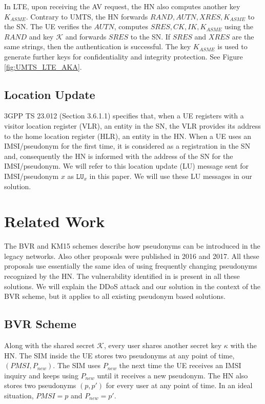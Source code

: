 \documentclass{llncs} %
\begin{document}
In LTE, upon receiving the AV request, the HN also computes another key $K_{ASME}$. Contrary to UMTS, the HN forwards $RAND,AUTN,XRES,K_{ASME}$ to the SN. The UE verifies the $AUTN$, computes $SRES,CK,IK, K_{ASME}$ using the $RAND$ and key $\mathcal{K}$ and forwards $SRES$ to the SN. If $SRES$ and $XRES$ are the same strings, then the authentication is successful. The key $K_{ASME}$ is used to generate further keys for confidentiality and integrity protection. See Figure \ref{fig:UMTS_LTE_AKA}.



\subsection{Location Update} 3GPP TS 23.012 (Section 3.6.1.1) \cite{TS23012} specifies that, when a UE registers with a visitor location register (VLR), an entity in the SN, the  VLR provides its address to the home location register (HLR), an entity in the HN. When a UE uses an IMSI/pseudonym for the first time, it is considered as a registration in the SN and, consequently the HN is informed with the address of the SN for the IMSI/pseudonym. We will refer to this location update (LU) message sent for IMSI/pseudonym $x$ as $\texttt{LU}_{x}$ in this paper. We will use these LU messages in our solution.


\section{Related Work}
The BVR and KM15 schemes describe how pseudonyms can be introduced in the legacy networks. Also other proposals \cite{Ginzboorg_Niemi_2016,Norrman_Naslund_Dubrova_2016,yemen2017} were published in 2016 and 2017. All these proposals use essentially the same idea of using frequently changing pseudonyms recognized by the HN. The vulnerability identified in \cite{wisec17} is present in all these solutions. We will explain the DDoS attack and our solution in the context of the BVR scheme, but it applies to all existing pseudonym based solutions.

\subsection{BVR Scheme}
Along with the shared secret $\mathcal{K}$, every user shares another secret key $\kappa$ with the HN. The SIM inside the UE stores two pseudonyms at any point of time, $\left(PMSI,P_{new}\right)$. The SIM uses $P_{new}$ the next time the UE receives an IMSI inquiry and keeps using $P_{new}$ until it receives a new pseudonym. The HN also stores two pseudonyms $\left(p,p'\right)$ for every user at any point of time. In an ideal situation, $PMSI = p$ and $P_{new} = p'$. 
\end{document}
